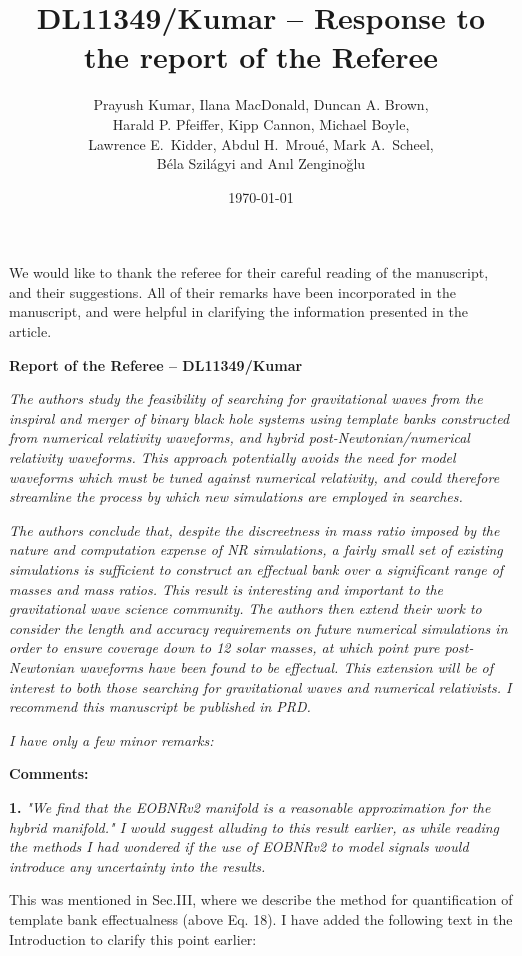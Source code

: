 \documentclass[a4paper,12pt]{article}
\title{DL11349/Kumar -- Response to the report of the Referee}
\author{Prayush Kumar, Ilana MacDonald, Duncan A. Brown,\\
Harald P. Pfeiffer, Kipp Cannon, Michael Boyle, \\
Lawrence E.~Kidder, Abdul H.~Mrou\'{e}, Mark A.~Scheel, \\
B\'{e}la Szil\'{a}gyi and An\i l Zengino\u{g}lu}
\date{\today}
\begin{document}
\maketitle

We would like to thank the referee for their careful reading of the 
manuscript, and their suggestions. All of their remarks have been 
incorporated in the manuscript, and were helpful in clarifying the 
information presented in the article.
\newline

\textbf{Report of the Referee -- DL11349/Kumar}

\textit{The authors study the feasibility of searching for gravitational waves
from the inspiral and merger of binary black hole systems using
template banks constructed from numerical relativity waveforms, and
hybrid post-Newtonian/numerical relativity waveforms. This approach
potentially avoids the need for model waveforms which must be tuned
against numerical relativity, and could therefore streamline the
process by which new simulations are employed in searches.}

\textit{The authors conclude that, despite the discreetness in mass ratio
imposed by the nature and computation expense of NR simulations, a
fairly small set of existing simulations is sufficient to construct an
effectual bank over a significant range of masses and mass ratios.
This result is interesting and important to the gravitational wave
science community. The authors then extend their work to consider the
length and accuracy requirements on future numerical simulations in
order to ensure coverage down to 12 solar masses, at which point pure
post-Newtonian waveforms have been found to be effectual. This
extension will be of interest to both those searching for
gravitational waves and numerical relativists. I recommend this
manuscript be published in PRD.}

\textit{I have only a few minor remarks:}
\newline

\textbf{Comments:}
\vspace{8pt}

{\bf 1.} \textit{"We find that the EOBNRv2 manifold is a reasonable approximation
for the hybrid manifold." I would suggest alluding to this result
earlier, as while reading the methods I had wondered if the use of
EOBNRv2 to model signals would introduce any uncertainty into the
results.}
\vspace{8pt}

This was mentioned in Sec.III, where we describe the method for
quantification of template bank effectualness (above Eq. 18). I have
added the following text in the Introduction to clarify this point
earlier:
\end{document}
